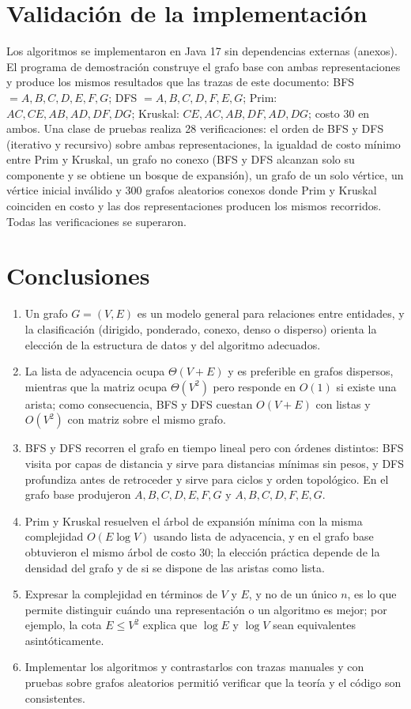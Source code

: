 \documentclass[conference]{IEEEtran}
\begin{document}
\section{Validación de la implementación}
Los algoritmos se implementaron en Java 17 sin dependencias externas (anexos). El programa de demostración construye el grafo base con ambas representaciones y produce los mismos resultados que las trazas de este documento: BFS $=A,B,C,D,E,F,G$; DFS $=A,B,C,D,F,E,G$; Prim: $AC, CE, AB, AD, DF, DG$; Kruskal: $CE, AC, AB, DF, AD, DG$; costo 30 en ambos. Una clase de pruebas realiza 28 verificaciones: el orden de BFS y DFS (iterativo y recursivo) sobre ambas representaciones, la igualdad de costo mínimo entre Prim y Kruskal, un grafo no conexo (BFS y DFS alcanzan solo su componente y se obtiene un bosque de expansión), un grafo de un solo vértice, un vértice inicial inválido y 300 grafos aleatorios conexos donde Prim y Kruskal coinciden en costo y las dos representaciones producen los mismos recorridos. Todas las verificaciones se superaron.

\section{Conclusiones}
\begin{enumerate}
  \item Un grafo $G=(V,E)$ es un modelo general para relaciones entre entidades, y la clasificación (dirigido, ponderado, conexo, denso o disperso) orienta la elección de la estructura de datos y del algoritmo adecuados.
  \item La lista de adyacencia ocupa $\Theta(V+E)$ y es preferible en grafos dispersos, mientras que la matriz ocupa $\Theta(V^2)$ pero responde en $O(1)$ si existe una arista; como consecuencia, BFS y DFS cuestan $O(V+E)$ con listas y $O(V^2)$ con matriz sobre el mismo grafo.
  \item BFS y DFS recorren el grafo en tiempo lineal pero con órdenes distintos: BFS visita por capas de distancia y sirve para distancias mínimas sin pesos, y DFS profundiza antes de retroceder y sirve para ciclos y orden topológico. En el grafo base produjeron $A,B,C,D,E,F,G$ y $A,B,C,D,F,E,G$.
  \item Prim y Kruskal resuelven el árbol de expansión mínima con la misma complejidad $O(E\log V)$ usando lista de adyacencia, y en el grafo base obtuvieron el mismo árbol de costo 30; la elección práctica depende de la densidad del grafo y de si se dispone de las aristas como lista.
  \item Expresar la complejidad en términos de $V$ y $E$, y no de un único $n$, es lo que permite distinguir cuándo una representación o un algoritmo es mejor; por ejemplo, la cota $E\le V^2$ explica que $\log E$ y $\log V$ sean equivalentes asintóticamente.
  \item Implementar los algoritmos y contrastarlos con trazas manuales y con pruebas sobre grafos aleatorios permitió verificar que la teoría y el código son consistentes.
\end{enumerate}
\end{document}
